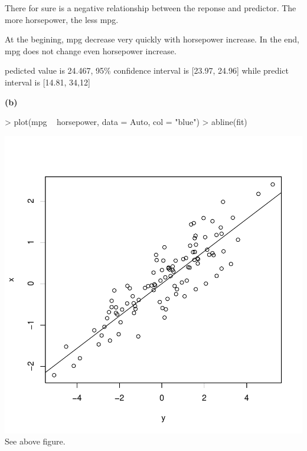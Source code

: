 \documentclass[a4paper]{article}
\renewcommand{\part}[1] {\vspace{.10in} {\bf (#1)}}
\begin{document}
\begin{enumerate}
{\color{red}
\item There for sure is a negative relationship between the reponse and predictor. The more horsepower, the less mpg.
\item At the begining, mpg decrease very quickly with horsepower increase. In the end, mpg does not change even horsepower increase.
\item pedicted value is 24.467, 95\% confidence interval is [23.97, 24.96] while predict interval is [14.81, 34,12]
}
\end{enumerate}


\part{b}
\begin{Schunk}
\begin{Sinput}
> plot(mpg ~ horsepower, data = Auto, col = "blue")
> abline(fit)
\end{Sinput}
\end{Schunk}
\includegraphics{lm-b}
{\color{red}\\ See above figure.}
\end{document}
